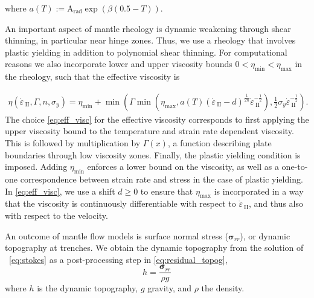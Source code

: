 \documentclass[12pt]{article}
\newcommand{\mgnote}[1]{\textcolor{magenta}{MG: #1}}
\newcommand{\IIinv}{{\dot\varepsilon}_{\mathrm{\!\!\:II}}}
\newcommand{\ssigma}{{\ensuremath{\boldsymbol{\sigma}}}}
\begin{document}
where $a(T):=\text{A}_{\text{rad}}\exp(\beta(0.5-T))$. 



An important aspect of mantle rheology is dynamic weakening
through shear thinning, in particular near hinge zones. Thus, 
we use a rheology that involves
plastic yielding in addition to polynomial shear thinning. For
computational reasons we also
incorporate lower and upper viscosity bounds
$0 < \eta_{\min} < \eta_{\max}$ in the rheology, such that the effective viscosity is


\begin{multline}
  \label{eq:eff_visc}
  \eta(\IIinv,\Gamma, n, \sigma_{y})=\eta_{\min}+\min(\Gamma\min(\eta_{\max}, a(T)(\IIinv-d)^{\frac{1}{2n}}\IIinv^{-\frac{1}{2}}),\frac{1}{2}\sigma_y\IIinv^{-\frac{1}{2}}).
\end{multline}
 The choice
\eqref{eq:eff_visc} for the effective viscosity corresponds to first
applying the upper viscosity bound to the temperature and strain rate
dependent viscosity. This is followed by multiplication by
$\Gamma(x)$, a function describing plate boundaries through low viscosity
zones. Finally, the plastic yielding condition is imposed. Adding
$\eta_{\min}$ enforces a lower bound on the viscosity, as well as a
one-to-one correspondence between strain rate and stress in the case
of plastic yielding.
In \eqref{eq:eff_visc}, we use a shift $d\ge 0$ to ensure that $\eta_{\max}$ is incorporated
in a way that the viscosity is continuously differentiable with
respect to $\IIinv$, and thus also with
respect to the velocity.  


An outcome of mantle flow models is surface normal stress ($\ssigma_{rr}$), or dynamic topography at trenches. We obtain the dynamic topography from the solution of ~\eqref{eq:stokes} as a post-processing step in \eqref{eq:residual_topog},
\begin{equation}
h= \frac{\ssigma_{rr}}{\rho g}
\label{eq:residual_topog}
\end{equation}
where $h$ is the dynamic topography, $g$ gravity, and $\rho$ the density. 
\end{document}
